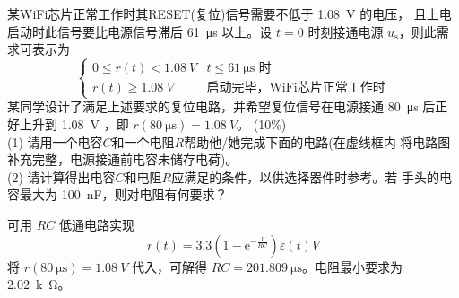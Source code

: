 \documentclass[a4paper,12pt]{examdesign}
\begin{document}
\begin{shortanswer}[title={第二部分}]
\begin{question}
    某WiFi芯片正常工作时其RESET(复位)信号需要不低于 \SI{1.08}{V} 的电压，
    且上电启动时此信号要比电源信号滞后 \SI{61}{\micro\second} 以上。设
    $t=0$ 时刻接通电源 $u_\mathrm{s}$，则此需求可表示为
    \[
        \begin{cases}
            0 \le r(t) < \SI{1.08}{V} & t \le \SI{61}{\micro\second} \text{ 时} \\
            r(t) \ge \SI{1.08}{V} & \text{启动完毕，WiFi芯片正常工作时}
        \end{cases}
    \]
    某同学设计了满足上述要求的复位电路，并希望复位信号在电源接通
    \SI{80}{\micro\second} 后正好上升到 \SI{1.08}{V} ，即
    $r(\SI{80}{\micro\second})=\SI{1.08}{V}$。 \hfill (10\%) \\
    (1) 请用一个电容$C$和一个电阻$R$帮助他/她完成下面的电路(在虚线框内
    将电路图补充完整，电源接通前电容未储存电荷)。\\
    (2) 请计算得出电容$C$和电阻$R$应满足的条件，以供选择器件时参考。若
    手头的电容最大为 \SI{100}{nF}，则对电阻有何要求？
    \begin{figure}[H]
    \hfill
    
    \end{figure}
    \examvspace*{2cm}
    \begin{answer}
        可用 $RC$ 低通电路实现
        \[r(t)=3.3(1-\mathrm{e}^{-\frac{t}{RC}})\varepsilon(t)\si{V}\]
        将 $r(\SI{80}{\micro\second})=\SI{1.08}{V}$ 代入，可解得
        $RC=\SI{201.809}{\micro\second}$。电阻最小要求为 \SI{2.02}{k\ohm}。
    \end{answer}
\end{question}
\end{shortanswer}
\end{document}
